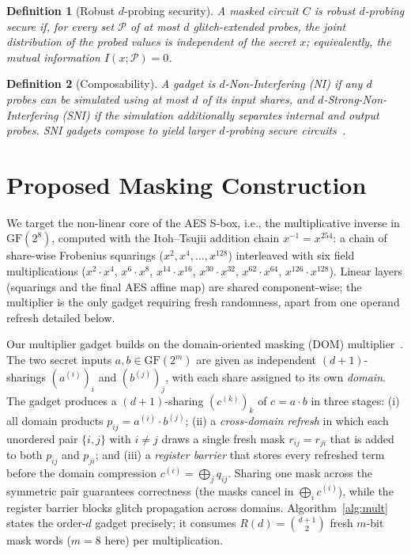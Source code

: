 \documentclass[lettersize,journal]{IEEEtran}
\newtheorem{definition}{Definition}
\newcommand{\GF}{\mathrm{GF}}
\newcommand{\share}[2]{#1^{(#2)}}
\begin{document}
\begin{definition}[Robust $d$-probing security]
\label{def:probing}
A masked circuit $C$ is \emph{robust $d$-probing secure} if, for every set
$\mathcal{P}$ of at most $d$ glitch-extended probes, the joint distribution of
the probed values is independent of the secret $x$; equivalently, the mutual
information $I(x;\mathcal{P}) = 0$.
\end{definition}

\begin{definition}[Composability]
\label{def:comp}
A gadget is $d$-Non-Interfering (NI) if any $d$ probes can be simulated using at
most $d$ of its input shares, and $d$-Strong-Non-Interfering (SNI) if the
simulation additionally separates internal and output probes. SNI gadgets
compose to yield larger $d$-probing secure circuits~\cite{barthe2016strong}.
\end{definition}

\section{Proposed Masking Construction}
\label{sec:construction}
We target the non-linear core of the AES S-box, i.e., the multiplicative inverse
in $\GF(2^8)$, computed with the Itoh--Tsujii addition chain
$x^{-1}=x^{254}$: a chain of share-wise Frobenius squarings
($x^{2},x^{4},\dots,x^{128}$) interleaved with six field multiplications
($x^{2}{\cdot}x^{4}$, $x^{6}{\cdot}x^{8}$, $x^{14}{\cdot}x^{16}$,
$x^{30}{\cdot}x^{32}$, $x^{62}{\cdot}x^{64}$, $x^{126}{\cdot}x^{128}$).
Linear layers (squarings and the final AES affine map) are shared
component-wise; the multiplier is the only gadget requiring fresh
randomness, apart from one operand refresh detailed below.

Our multiplier gadget builds on the domain-oriented masking (DOM)
multiplier~\cite{gross2016dom}. The two secret inputs $a,b\in\GF(2^m)$ are given
as independent $(d{+}1)$-sharings $(\share{a}{i})_{i}$ and $(\share{b}{j})_{j}$,
with each share assigned to its own \emph{domain}. The gadget produces a
$(d{+}1)$-sharing $(\share{c}{k})_{k}$ of $c=a\cdot b$ in three stages:
(i) all domain products $p_{ij}=\share{a}{i}\cdot\share{b}{j}$;
(ii) a \emph{cross-domain refresh} in which each unordered pair $\{i,j\}$ with
$i\neq j$ draws a single fresh mask $r_{ij}=r_{ji}$ that is added to both
$p_{ij}$ and $p_{ji}$; and (iii) a \emph{register barrier} that stores every
refreshed term before the domain compression $\share{c}{i}=\bigoplus_j q_{ij}$.
Sharing one mask across the symmetric pair guarantees correctness (the masks
cancel in $\bigoplus_i\share{c}{i}$), while the register barrier blocks glitch
propagation across domains. Algorithm~\ref{alg:mult} states the order-$d$ gadget
precisely; it consumes $R(d)=\binom{d+1}{2}$ fresh $m$-bit mask words ($m{=}8$ here) per multiplication.
\end{document}
